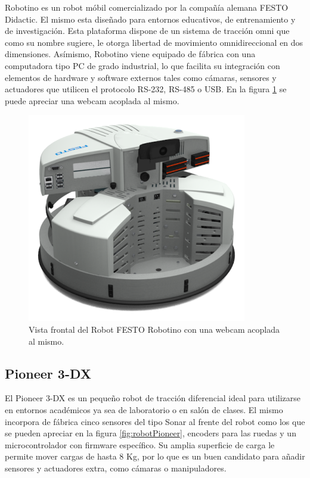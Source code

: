 Robotino es un robot móbil comercializado por la compañía alemana FESTO Didactic. El mismo esta diseñado para entornos educativos, de entrenamiento y de investigación.
Esta plataforma dispone de un sistema de tracción omni que como su nombre sugiere, le otorga libertad de movimiento omnidireccional en dos dimensiones.\newline
Asímismo, Robotino viene equipado de fábrica con una computadora tipo PC de grado industrial, lo que facilita su integración con elementos de hardware y software externos tales como cámaras, sensores y actuadores que utilicen el protocolo RS-232, RS-485 o USB. En la figura \ref{fig:robotRobotino} se puede apreciar una webcam acoplada al mismo.

\begin{figure}[ht]
	\centering
	\includegraphics[scale=1.4]{./Figures/robotino.png}
	\caption{Vista frontal del Robot FESTO Robotino con una webcam acoplada al mismo.\protect\footnotemark}
	\label{fig:robotRobotino}
\end{figure}



\subsection{Pioneer 3-DX}

El Pioneer 3-DX es un pequeño robot de tracción diferencial ideal para utilizarse en entornos académicos ya sea de laboratorio o en salón de clases. El mismo incorpora de fábrica cinco sensores del tipo Sonar al frente del robot como los que se pueden apreciar en la figura \ref{fig:robotPioneer}, encoders para las ruedas y un microcontrolador con firmware específico.\newline
Su amplia superficie de carga le permite mover cargas de hasta 8 Kg, por lo que es un buen candidato para añadir sensores y actuadores extra, como cámaras o manipuladores.

